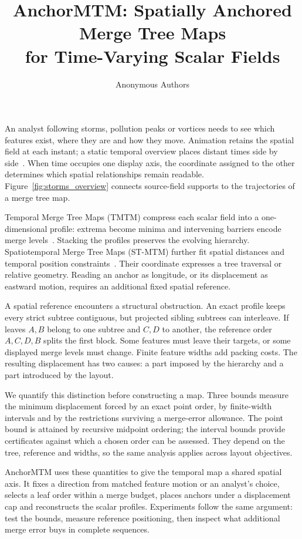 \documentclass[review]{vgtc}
\title{AnchorMTM: Spatially Anchored Merge Tree Maps\\for Time-Varying Scalar Fields}
\author{Anonymous Authors}
\begin{document}
\maketitle
\raggedbottom
\setlength{\emergencystretch}{1.5em}
An analyst following storms, pollution peaks or vortices needs to see which features exist, where they are and how they move. Animation retains the spatial field at each instant; a static temporal overview places distant times side by side~\cite{Tversky:2002:Animation,Robertson:2008:Animation,Bach:2017:STC}. When time occupies one display axis, the coordinate assigned to the other determines which spatial relationships remain readable. Figure~\ref{fig:storms_overview} connects source-field supports to the trajectories of a merge tree map.

Temporal Merge Tree Maps (TMTM) compress each scalar field into a one-dimensional profile: extrema become minima and intervening barriers encode merge levels~\cite{Koepp:2023:TMTM}. Stacking the profiles preserves the evolving hierarchy. Spatiotemporal Merge Tree Maps (ST-MTM) further fit spatial distances and temporal position constraints~\cite{STMTM:2026}. Their coordinate expresses a tree traversal or relative geometry. Reading an anchor as longitude, or its displacement as eastward motion, requires an additional fixed spatial reference.

A spatial reference encounters a structural obstruction. An exact profile keeps every strict subtree contiguous, but projected sibling subtrees can interleave. If leaves $A,B$ belong to one subtree and $C,D$ to another, the reference order $A,C,D,B$ splits the first block. Some features must leave their targets, or some displayed merge levels must change. Finite feature widths add packing costs. The resulting displacement has two causes: a part imposed by the hierarchy and a part introduced by the layout.

We quantify this distinction before constructing a map. Three bounds measure the minimum displacement forced by an exact point order, by finite-width intervals and by the restrictions surviving a merge-error allowance. The point bound is attained by recursive midpoint ordering; the interval bounds provide certificates against which a chosen order can be assessed. They depend on the tree, reference and widths, so the same analysis applies across layout objectives.

AnchorMTM uses these quantities to give the temporal map a shared spatial axis. It fixes a direction from matched feature motion or an analyst's choice, selects a leaf order within a merge budget, places anchors under a displacement cap and reconstructs the scalar profiles. Experiments follow the same argument: test the bounds, measure reference positioning, then inspect what additional merge error buys in complete sequences.
\end{document}
